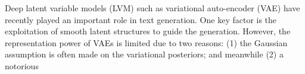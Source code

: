 Deep latent variable models (LVM) such as variational auto-encoder (VAE) have recently played an important role in text generation. One key factor is the exploitation of smooth latent structures to guide the generation. However, the representation power of VAEs is limited due to two reasons: (1) the Gaussian assumption is often made on the variational posteriors; and meanwhile (2) a notorious